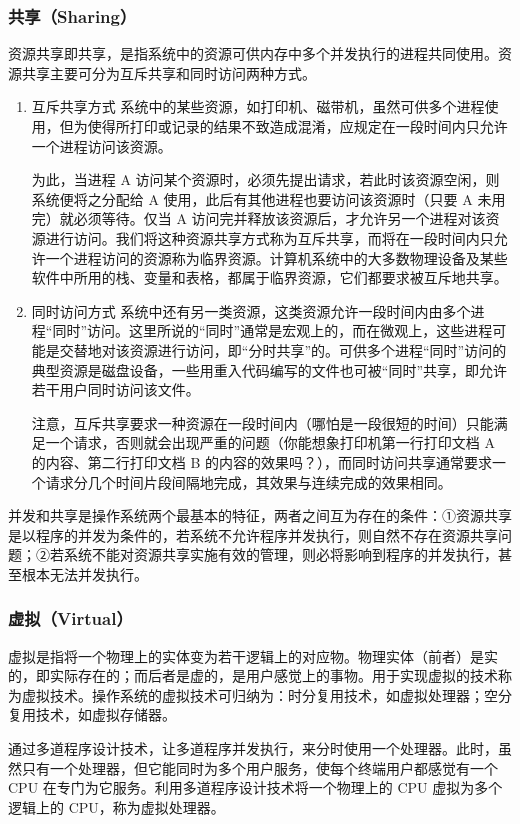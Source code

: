 \documentclass{ctexbook}
\begin{document}
	\subsubsection{共享（Sharing）}
	资源共享即共享，是指系统中的资源可供内存中多个并发执行的进程共同使用。资源共享主要可分为互斥共享和同时访问两种方式。
	\begin{enumerate}
		\item 互斥共享方式
		系统中的某些资源，如打印机、磁带机，虽然可供多个进程使用，但为使得所打印或记录的结果不致造成混淆，应规定在一段时间内只允许一个进程访问该资源。
		
		为此，当进程 A 访问某个资源时，必须先提出请求，若此时该资源空闲，则系统便将之分配给 A 使用，此后有其他进程也要访问该资源时（只要 A 未用完）就必须等待。仅当 A 访问完并释放该资源后，才允许另一个进程对该资源进行访问。我们将这种资源共享方式称为互斥共享，而将在一段时间内只允许一个进程访问的资源称为临界资源。计算机系统中的大多数物理设备及某些软件中所用的栈、变量和表格，都属于临界资源，它们都要求被互斥地共享。
		\item 同时访问方式
		系统中还有另一类资源，这类资源允许一段时间内由多个进程“同时”访问。这里所说的“同时”通常是宏观上的，而在微观上，这些进程可能是交替地对该资源进行访问，即“分时共享”的。可供多个进程“同时”访问的典型资源是磁盘设备，一些用重入代码编写的文件也可被“同时”共享，即允许若干用户同时访问该文件。
		
		注意，互斥共享要求一种资源在一段时间内（哪怕是一段很短的时间）只能满足一个请求，否则就会出现严重的问题（你能想象打印机第一行打印文档 A 的内容、第二行打印文档 B 的内容的效果吗？），而同时访问共享通常要求一个请求分几个时间片段间隔地完成，其效果与连续完成的效果相同。
	\end{enumerate}
	
	并发和共享是操作系统两个最基本的特征，两者之间互为存在的条件：①资源共享是以程序的并发为条件的，若系统不允许程序并发执行，则自然不存在资源共享问题；②若系统不能对资源共享实施有效的管理，则必将影响到程序的并发执行，甚至根本无法并发执行。
	
	\subsubsection{虚拟（Virtual）}
	虚拟是指将一个物理上的实体变为若干逻辑上的对应物。物理实体（前者）是实的，即实际存在的；而后者是虚的，是用户感觉上的事物。用于实现虚拟的技术称为虚拟技术。操作系统的虚拟技术可归纳为：时分复用技术，如虚拟处理器；空分复用技术，如虚拟存储器。
	
	通过多道程序设计技术，让多道程序并发执行，来分时使用一个处理器。此时，虽然只有一个处理器，但它能同时为多个用户服务，使每个终端用户都感觉有一个 CPU 在专门为它服务。利用多道程序设计技术将一个物理上的 CPU 虚拟为多个逻辑上的 CPU，称为虚拟处理器。
	
\end{document}
